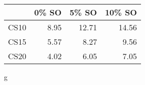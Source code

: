 \begin{table}[ht]
\begin{center}
\begin{tabular}{rrrr}
  \hline
 & 0\% SO & 5\% SO & 10\% SO \\
  \hline
CS10 & 8.95 & 12.71 & 14.56 \\
  CS15 & 5.57 & 8.27 & 9.56 \\
  CS20 & 4.02 & 6.05 & 7.05 \\
   \hline
\end{tabular}
\end{center}
\end{table}g

